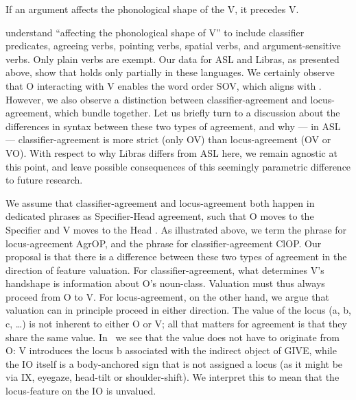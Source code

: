 \documentclass[output=paper,colorlinks,citecolor=brown,
]{langscibook}
\begin{document}
\ea 
    \label{lasz:ex:11}
    If an argument affects the phonological shape of the V, it precedes V. 
    \citep{Napoli.SS.2014}
\z 

\citeauthor{Napoli.SS.2014} understand “affecting the phonological shape
of V” to include classifier predicates, agreeing verbs, pointing verbs,
spatial verbs, and argument-sensitive verbs. Only plain verbs are
exempt. Our data for ASL and Libras, as presented above, show that
 holds only partially in these languages. We certainly observe that
O interacting with V enables the word order SOV, which aligns with
. However, we also observe a distinction between
classifier-agreement and locus-agreement, which \citeauthor{Napoli.SS.2014} 
bundle together. Let us briefly turn to a discussion
about the differences in syntax between these two types of agreement,
and why --- in ASL --- classifier-agreement is more strict (only OV)
than locus-agreement (OV or VO). With respect to why Libras differs
from ASL here, we remain agnostic at this point, and leave possible
consequences of this seemingly parametric difference to future
research.

We assume that classifier-agreement and locus-agreement both
happen in dedicated phrases as Specifier-Head agreement, such that O
moves to the Specifier and V moves to the Head \citep{Benedicto.Brentari.2004,Kuhn.2016}. 
As illustrated above, we term the phrase
for locus-agreement AgrOP, and the phrase for classifier-agreement
ClOP. Our proposal is that there is a difference between these two types
of agreement in the direction of feature valuation. For
classifier-agreement, what determines V’s handshape is information
about O’s noun-class. Valuation must thus always proceed from O to
V. For locus-agreement, on the other hand, we argue that valuation can
in principle proceed in either direction. The value of the locus (a, b, c,
\ldots) is not inherent to either O or V; all that matters for agreement is
that they share the same value. In~ we see that the value does not
have to originate from O: V introduces the locus b associated with the
indirect object of GIVE, while the IO itself is a body-anchored sign
that is not assigned a locus (as it might be via IX, eyegaze, head-tilt or
shoulder-shift). We interpret this to mean that the locus-feature on the
IO is unvalued.
\end{document}
